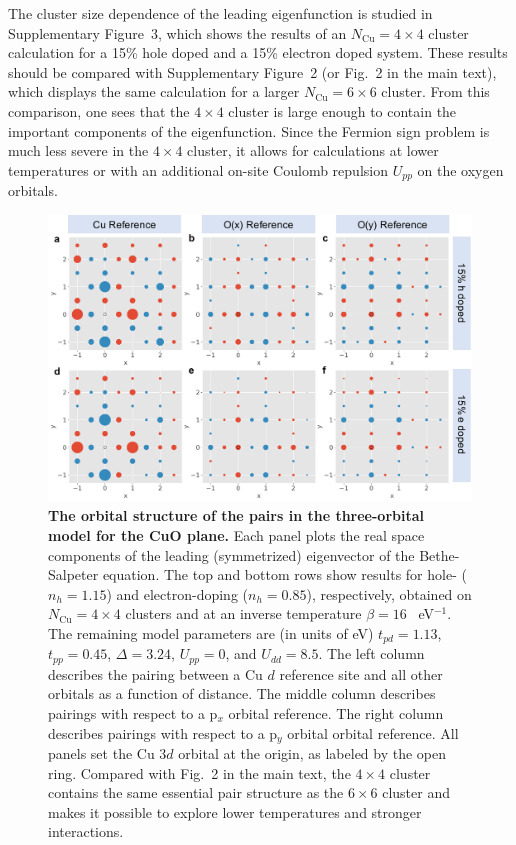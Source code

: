 \documentclass[11pt,superscriptaddress,floatfix,notitlepage]{revtex4-1}
\begin{document}
The cluster size dependence of the leading eigenfunction is studied in Supplementary Figure~3, which shows the results of an $N_\text{Cu} = 4\times 4$ cluster calculation for a 15\% hole doped and a 15\% electron doped system. These results should be compared with Supplementary Figure~2 (or Fig.~2 in the main text), which displays the same calculation for a larger $N_\text{Cu}=6\times 6$ cluster. From this comparison, one sees that the $4\times 4$ cluster is large enough to contain the important components of the eigenfunction. Since the Fermion sign problem is much less severe in the $4\times 4$ cluster, it allows for calculations at lower temperatures or with an additional on-site Coulomb repulsion $U_{pp}$ on the oxygen orbitals. 

\begin{figure}[h]
\centering
\includegraphics[width=\linewidth]{./Figures/DCAeigenvector4by4.pdf}
\caption{\textbf{The orbital structure of the pairs in the 
three-orbital model for the CuO plane.} Each panel plots the real space components of the leading (symmetrized) eigenvector of the Bethe-Salpeter equation.  The top and bottom rows show results for hole- ($n_h=1.15$) and electron-doping ($n_h=0.85$), respectively, obtained on $N_\text{Cu} = 4\times 4$ clusters and at an inverse temperature $\beta=16$ ~eV$^{-1}$. The remaining model parameters are (in units of eV) $t_{pd}=1.13$, $t_{pp}=0.45$, $\Delta=3.24$, $U_{pp} = 0$, and $U_{dd}=8.5$. The left column describes the pairing between a Cu $d$ reference site and all other orbitals as a function of distance. The middle column describes pairings with respect to a p$_x$ orbital reference. The right column describes pairings with respect to a p$_y$ orbital orbital reference. All panels set the Cu $3d$ orbital at the origin, as labeled by the open ring. Compared with Fig.~2 in the main text, the $4\times4$ cluster contains the same essential pair structure as the $6\times 6$ cluster and makes it possible to explore lower temperatures and stronger interactions.}
\label{Fig:DCAeigenvector4by4}
\end{figure}
\end{document}
